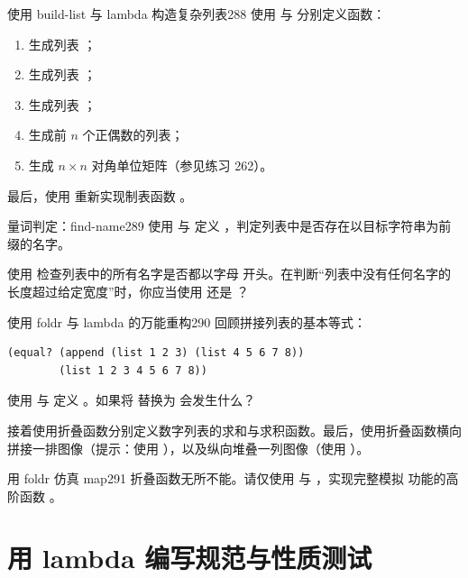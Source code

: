 \begin{exercise}{使用 build-list 与 lambda 构造复杂列表}{288}
使用  与  分别定义函数：
\begin{enumerate}
  \item 生成列表 ；
  \item 生成列表 ；
  \item 生成列表 ；
  \item 生成前 $n$ 个正偶数的列表；
  \item 生成 $n \times n$ 对角单位矩阵（参见练习 262）。
\end{enumerate}
最后，使用  重新实现制表函数 。
\end{exercise}

\begin{exercise}{量词判定：find-name}{289}
使用  与  定义 ，判定列表中是否存在以目标字符串为前缀的名字。

使用  检查列表中的所有名字是否都以字母  开头。在判断“列表中没有任何名字的长度超过给定宽度”时，你应当使用  还是 ？
\end{exercise}

\begin{exercise}{使用 foldr 与 lambda 的万能重构}{290}
回顾拼接列表的基本等式：
\begin{lstlisting}[language=BSL]
(equal? (append (list 1 2 3) (list 4 5 6 7 8))
        (list 1 2 3 4 5 6 7 8))
\end{lstlisting}
使用  与  定义 。如果将  替换为  会发生什么？

接着使用折叠函数分别定义数字列表的求和与求积函数。最后，使用折叠函数横向拼接一排图像（提示：使用 ），以及纵向堆叠一列图像（使用 ）。
\end{exercise}

\begin{exercise}{用 foldr 仿真 map}{291}
折叠函数无所不能。请仅使用  与 ，实现完整模拟  功能的高阶函数 。
\end{exercise}

\section{用 lambda 编写规范与性质测试}
\label{sec:17_4}

